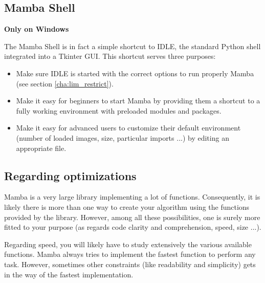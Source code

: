 \documentclass[a4paper,10pt,oneside]{article}
\begin{document}
\subsection{Mamba Shell}
\label{cha:mamba_shell}

\textbf{Only on Windows}

The Mamba Shell is in fact a simple shortcut to IDLE, the standard Python shell
integrated into a Tkinter GUI. This shortcut serves three purposes:

\begin{itemize}
\item Make sure IDLE is started with the correct options to run properly Mamba
(see section \ref{cha:lim_restrict}).
\item Make it easy for beginners to start Mamba by providing them a shortcut
to a fully working environment with preloaded modules and packages.
\item Make it easy for advanced users to customize their default environment
(number of loaded images, size, particular imports ...) by editing an appropriate
file.
\end{itemize}


\subsection{Regarding optimizations}


Mamba is a very large library implementing a lot of functions. Consequently, it
is likely there is more than one way to create your algorithm using the functions
provided by the library. However, among all these possibilities, one is surely more
fitted to your purpose (as regards code clarity and comprehension, speed, size ...).

Regarding speed, you will likely have to study extensively the various
available functions. Mamba always tries to implement the fastest function to 
perform any task. However, sometimes other constraints (like readability and
simplicity) gets in the way of the fastest implementation.
\end{document}
